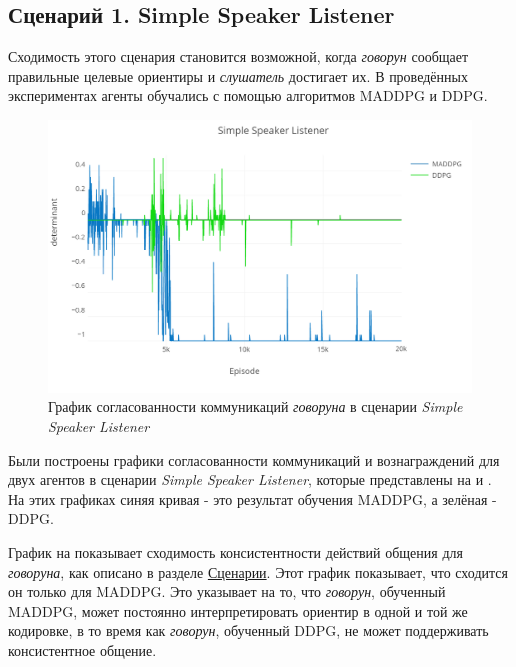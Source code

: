 \subsection{Сценарий 1. Simple Speaker Listener}

Сходимость этого сценария становится возможной, когда \textit{говорун} сообщает правильные целевые ориентиры и \textit{слушатель} достигает их. В проведённых экспериментах агенты обучались с помощью алгоритмов MADDPG и DDPG.

\begin{figure}[ht!]
    \center
    \includegraphics [scale=0.38] {my_folder/images/ch5/ssl-comm.png}
    \caption{График согласованности коммуникаций \textit{говоруна} в сценарии \textit{Simple Speaker Listener}}
    \label{fig:result-ssl-comm}
\end{figure}

Были построены графики согласованности коммуникаций и вознаграждений для двух агентов в сценарии \textit{Simple Speaker Listener}, которые представлены на  и . На этих графиках синяя кривая - это результат обучения MADDPG, а зелёная - DDPG.

График на  показывает сходимость консистентности действий общения для \textit{говоруна}, как описано в разделе \hyperref[exp-ssl]{Сценарии}. Этот график показывает, что сходится он только для MADDPG. Это указывает на то, что \textit{говорун}, обученный MADDPG, может постоянно интерпретировать ориентир в одной и той же кодировке, в то время как \textit{говорун}, обученный DDPG, не может поддерживать консистентное общение.

